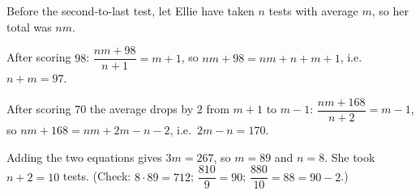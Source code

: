 Before the second-to-last test, let Ellie have taken $n$ tests with average $m$, so her total was $nm$.

After scoring $98$: $\dfrac{nm+98}{n+1}=m+1$, so $nm+98=nm+n+m+1$, i.e.\ $n+m=97$.

After scoring $70$ the average drops by $2$ from $m+1$ to $m-1$: $\dfrac{nm+168}{n+2}=m-1$, so $nm+168=nm+2m-n-2$, i.e.\ $2m-n=170$.

Adding the two equations gives $3m=267$, so $m=89$ and $n=8$. She took $n+2=\boxed{10}$ tests. (Check: $8\cdot89=712$; $\dfrac{810}{9}=90$; $\dfrac{880}{10}=88=90-2$.)
